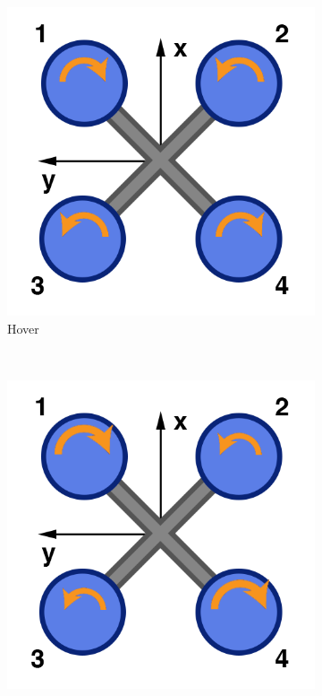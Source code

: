         \begin{figure}[ht]
                \centering
                \begin{subfigure}[b]{0.4\textwidth}
                        \centering
                        \includegraphics[width=\textwidth]{../images/hover.png}
                        \caption{Hover}
                        \label{fig:hover}
                \end{subfigure}%
                ~ %
                \begin{subfigure}[b]{0.4\textwidth}
                        \centering
                        \includegraphics[width=\textwidth]{../images/yaw.png}

\end{subfigure}
\end{figure}
